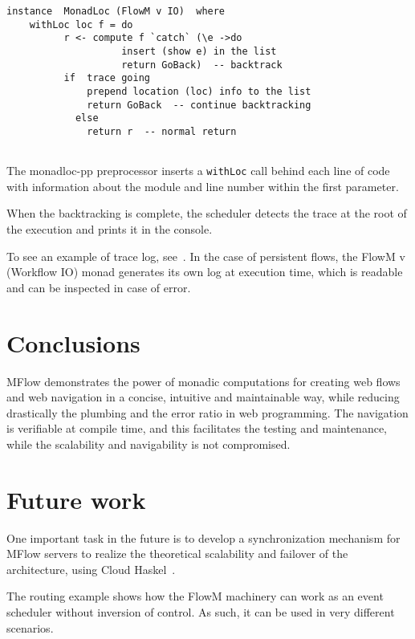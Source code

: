 \documentclass{tmr}
\begin{document}
{\tt

\begin{verbatim}
instance  MonadLoc (FlowM v IO)  where 
    withLoc loc f = do 
          r <- compute f `catch` (\e ->do 
                    insert (show e) in the list 
                    return GoBack)  -- backtrack 
          if  trace going 
              prepend location (loc) info to the list 
              return GoBack  -- continue backtracking 
            else 
              return r  -- normal return 
 
 \end{verbatim}
 
 }
 
The monadloc-pp preprocessor inserts a {\tt withLoc} call behind each line of code with information about the module and line number within the first parameter. 

When the backtracking is complete, the scheduler detects the trace at the root of the execution and prints it in the console.
 
To see an example of trace log, see~\cite{auth:trace}. In the case of persistent flows, the FlowM v (Workflow IO) monad generates its own log at execution time, which is readable and can be inspected in case of error. 
 
\section{Conclusions} 
 
MFlow demonstrates the power of monadic computations for creating web flows and web navigation in a concise, intuitive and maintainable way, while reducing drastically the plumbing and the error ratio in web programming.  The navigation is verifiable at compile time, and this facilitates the testing and maintenance, while the scalability and navigability is not compromised.  
  
\section{Future work}  
  
One important task in the future is to develop a synchronization mechanism for MFlow servers to realize the theoretical scalability and failover of the architecture, using Cloud Haskel~\cite{auth:cloudhaskell}.  
  
The routing example shows how the FlowM machinery can work as an event scheduler without inversion of control.  As such, it can be used in very different scenarios. 
\end{document}

